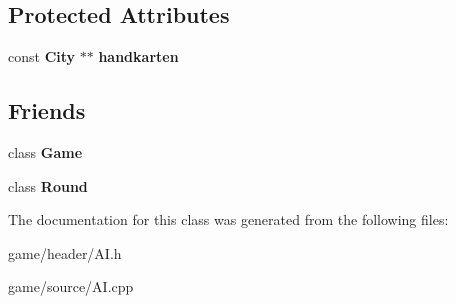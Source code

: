 \subsection*{Protected Attributes}
\begin{DoxyCompactItemize}
\item 
const {\bf City} $\ast$$\ast$ {\bfseries handkarten}\label{class_a_i_a6590ef2bcc78311781a95899a41ac6f5}

\end{DoxyCompactItemize}
\subsection*{Friends}
\begin{DoxyCompactItemize}
\item 
class {\bfseries Game}\label{class_a_i_aa2fab026580d6f14280c2ffb8063a314}

\item 
class {\bfseries Round}\label{class_a_i_aae72f8e1249fbf187032c257b544873d}

\end{DoxyCompactItemize}


The documentation for this class was generated from the following files\-:\begin{DoxyCompactItemize}
\item 
game/header/A\-I.\-h\item 
game/source/A\-I.\-cpp\end{DoxyCompactItemize}
